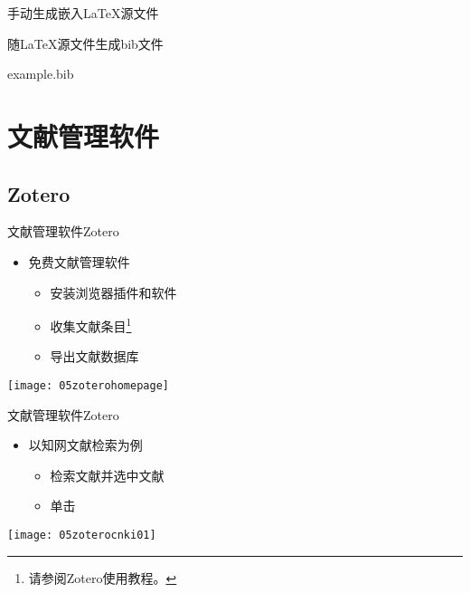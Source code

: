 \documentclass[fontset = none, t]{ctexbeamer}
\begin{document}
\begin{frame}[fragile]{手动生成}{嵌入\LaTeX 源文件}
\begin{spacing}{1.3}
\begin{center}
\begin{minipage}[h]{0.55\linewidth}
\begin{textcb}{随\LaTeX 源文件生成bib文件}
\begin{filecontents}{example.bib}
\section[文献管理软件]{文献管理软件}
\subsection[Zotero]{Zotero}
\begin{frame}[fragile]{文献管理软件}{Zotero}
  \begin{spacing}{1.5}
    \begin{itemize}
    \item 免费文献管理软件
      \begin{itemize}
      \item 安装浏览器插件和软件
      \item 收集文献条目\footnote[frame,2]{请参阅Zotero使用教程。}
      \item 导出文献数据库
      \end{itemize}
    \end{itemize}    
    \begin{center}
      \texttt{[image: 05zoterohomepage]}
    \end{center}
  \end{spacing}
\end{frame}

\begin{frame}[fragile]{文献管理软件}{Zotero}
  \begin{spacing}{1.2}
    \begin{itemize}
    \item 以\alert{知网}文献检索为例
      \begin{itemize}
      \item 检索文献并选中文献
      \item 单击
      \end{itemize}
    \end{itemize}    
    \begin{center}
      \begin{annotatedFigure}
        {\texttt{[image: 05zoterocnki01]}}
      \end{annotatedFigure}      
    \end{center}
  \end{spacing}
\end{frame}


\end{filecontents}
\end{textcb}
\end{minipage}
\end{center}
\end{spacing}
\end{frame}
\end{document}

